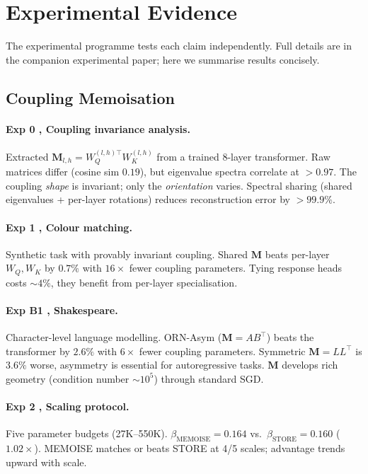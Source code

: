 \documentclass[11pt, a4paper]{article}
\newcommand{\M}{\mathbf{M}}
\theoremstyle{remark}
\begin{document}
\section{Experimental Evidence}
\label{sec:evidence}

The experimental programme tests each claim independently.
Full details are in the companion experimental paper; here we summarise results concisely.

\subsection{Coupling Memoisation}

\paragraph{Exp 0 ,  Coupling invariance analysis.}
Extracted $\M_{l,h} = W_Q^{(l,h)\top} W_K^{(l,h)}$ from a trained 8-layer transformer.
Raw matrices differ (cosine sim $0.19$), but eigenvalue spectra correlate at $>0.97$.
The coupling \emph{shape} is invariant; only the \emph{orientation} varies.
Spectral sharing (shared eigenvalues + per-layer rotations) reduces reconstruction error by $>99.9\%$.

\paragraph{Exp 1 ,  Colour matching.}
Synthetic task with provably invariant coupling.
Shared $\M$ beats per-layer $W_Q, W_K$ by $0.7\%$ with $16\times$ fewer coupling parameters.
Tying response heads costs ${\sim}4\%$, they benefit from per-layer specialisation.

\paragraph{Exp B1 ,  Shakespeare.}
Character-level language modelling.
ORN-Asym ($\M = AB^\top$) beats the transformer by $2.6\%$ with $6\times$ fewer coupling parameters.
Symmetric $\M = LL^\top$ is $3.6\%$ worse, asymmetry is essential for autoregressive tasks.
$\M$ develops rich geometry (condition number ${\sim}10^5$) through standard SGD.

\paragraph{Exp 2 ,  Scaling protocol.}
Five parameter budgets (27K--550K).
$\beta_{\text{MEMOISE}} = 0.164$ vs.\ $\beta_{\text{STORE}} = 0.160$ ($1.02\times$).
MEMOISE matches or beats STORE at 4/5 scales; advantage trends upward with scale.
\end{document}
